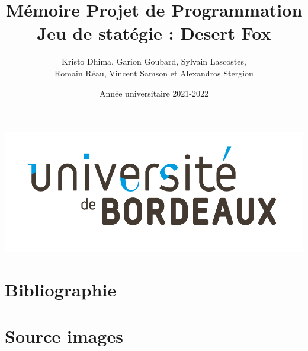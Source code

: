 \documentclass{article}[a4paper, 12pt]
\title{\LARGE \textbf{Mémoire Projet de Programmation  } \\ \Large \textbf{Jeu de statégie : Desert Fox}}
\author{Kristo Dhima, Garion Goubard, Sylvain Lascostes, \\Romain Réau, Vincent Samson et Alexandros Stergiou }
\date{Année universitaire 2021-2022}
\begin{document}
\maketitle
\begin{center}
    \center
    \includegraphics[scale=0.2]{data/Universite_Bordeaux_RVB-10.jpg}

\end{center}

\newpage

{\hypersetup{hidelinks} \tableofcontents} %


\newpage



\newpage


\newpage


\newpage


\newpage








\section{Bibliographie}




\section{Source images}

\printendnotes


\end{document}
